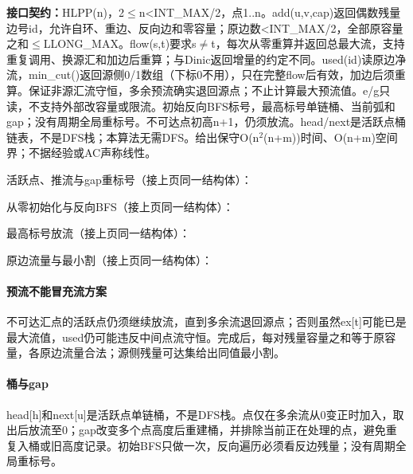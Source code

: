 {\sloppy{}\noindent\textbf{接口契约：}HLPP(n)，2$\le$n<INT\_MAX/2，点1..n。add(u,v,cap)返回偶数残量边号id，允许自环、重边、反向边和零容量；原边数<INT\_MAX/2，全部原容量之和$\le$LLONG\_MAX。flow(s,t)要求s$\ne$t，每次从零重算并返回总最大流，支持重复调用、换源汇和加边后重算；与Dinic返回增量的约定不同。used(id)读原边净流，min\_cut()返回源侧0/1数组（下标0不用），只在完整flow后有效，加边后须重算。保证非源汇流守恒，多余预流确实退回源点；不止计算最大预流值。e/g只读，不支持外部改容量或限流。初始反向BFS标号，最高标号单链桶、当前弧和gap；没有周期全局重标号。不可达点初高n+1，仍须放流。head/next是活跃点桶链表，不是DFS栈；本算法无需DFS。给出保守O(n$^{2}$(n+m))时间、O(n+m)空间界；不据经验或AC声称线性。\par}



\newpage\noindent 活跃点、推流与gap重标号（接上页同一结构体）：



\newpage\noindent 从零初始化与反向BFS（接上页同一结构体）：



\newpage\noindent 最高标号放流（接上页同一结构体）：



\newpage\noindent 原边流量与最小割（接上页同一结构体）：



\paragraph{预流不能冒充流方案} 不可达汇点的活跃点仍须继续放流，直到多余流退回源点；否则虽然ex[t]可能已是最大流值，used仍可能违反中间点流守恒。完成后，每对残量容量之和等于原容量，各原边流量合法；源侧残量可达集给出同值最小割。

\paragraph{桶与gap} head[h]和next[u]是活跃点单链桶，不是DFS栈。点仅在多余流从0变正时加入，取出后放流至0；gap改变多个点高度后重建桶，并排除当前正在处理的点，避免重复入桶或旧高度记录。初始BFS只做一次，反向遍历必须看反边残量；没有周期全局重标号。

